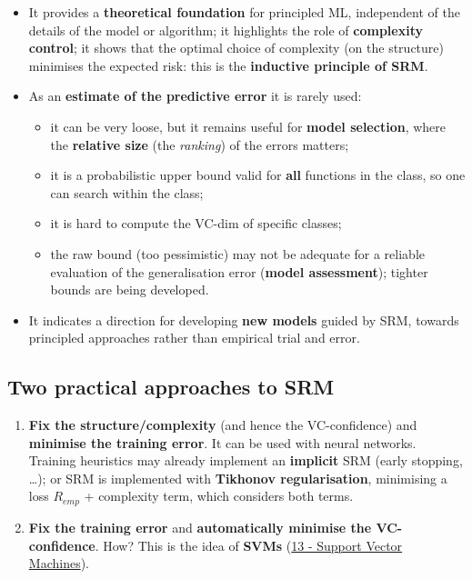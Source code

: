\begin{itemize}
\tightlist
\item
  It provides a \textbf{theoretical foundation} for principled ML,
  independent of the details of the model or algorithm; it highlights
  the role of \textbf{complexity control}; it shows that the optimal
  choice of complexity (on the structure) minimises the expected risk:
  this is the \textbf{inductive principle of SRM}.
\item
  As an \textbf{estimate of the predictive error} it is rarely used:

  \begin{itemize}
  \tightlist
  \item
    it can be very loose, but it remains useful for \textbf{model
    selection}, where the \textbf{relative size} (the \emph{ranking})
    of the errors matters;
  \item
    it is a probabilistic upper bound valid for \textbf{all} functions
    in the class, so one can search within the class;
  \item
    it is hard to compute the VC-dim of specific classes;
  \item
    the raw bound (too pessimistic) may not be adequate for a reliable
    evaluation of the generalisation error (\textbf{model assessment});
    tighter bounds are being developed.
  \end{itemize}
\item
  It indicates a direction for developing \textbf{new models} guided by
  SRM, towards principled approaches rather than empirical trial and
  error.
\end{itemize}

\subsection{Two practical approaches to
SRM}\label{due-approcci-pratici-alla-srm}

\begin{enumerate}
\def\labelenumi{\arabic{enumi}.}
\tightlist
\item
  \textbf{Fix the structure/complexity} (and hence the VC-confidence)
  and \textbf{minimise the training error}. It can be used with neural
  networks. Training heuristics may already implement an
  \textbf{implicit} SRM (early stopping, \ldots); or SRM is implemented
  with \textbf{Tikhonov regularisation}, minimising a loss \(R_{emp}\)
  + complexity term, which considers both terms.
\item
  \textbf{Fix the training error} and \textbf{automatically minimise
  the VC-confidence}. How? This is the idea of \textbf{SVMs}
  (\href{13\%20-\%20Support\%20Vector\%20Machines}{13 - Support Vector
  Machines}).
\end{enumerate}

